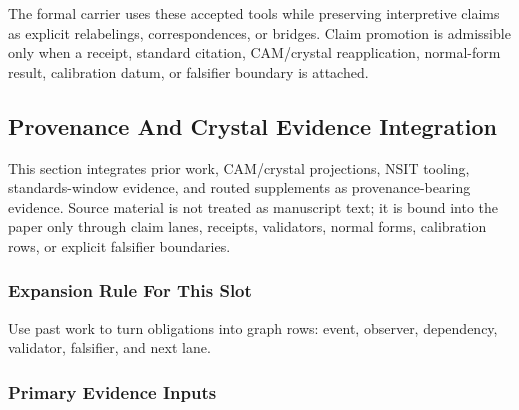 \documentclass[11pt]{article}
\begin{document}
The formal carrier uses these accepted tools while preserving interpretive
claims as explicit relabelings, correspondences, or bridges. Claim promotion is admissible only when a receipt, standard citation,
CAM/crystal reapplication, normal-form result, calibration datum, or falsifier
boundary is attached.

\subsection*{Provenance And Crystal Evidence Integration}

This section integrates prior work, CAM/crystal projections, NSIT tooling,
standards-window evidence, and routed supplements as provenance-bearing
evidence. Source material is not treated as manuscript text; it is bound into
the paper only through claim lanes, receipts, validators, normal forms,
calibration rows, or explicit falsifier boundaries.

\subsubsection*{Expansion Rule For This Slot}

Use past work to turn obligations into graph rows: event, observer, dependency, validator, falsifier, and next lane.

\subsubsection*{Primary Evidence Inputs}
\end{document}

